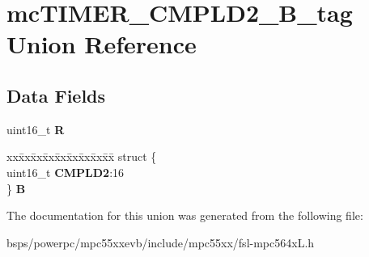 \hypertarget{unionmcTIMER__CMPLD2__16B__tag}{}\section{mc\+T\+I\+M\+E\+R\+\_\+\+C\+M\+P\+L\+D2\+\_\+B\+\_\+tag Union Reference}
\label{unionmcTIMER__CMPLD2__16B__tag}
\subsection*{Data Fields}
\begin{DoxyCompactItemize}
\item 
\mbox{\label{unionmcTIMER__CMPLD2__16B__tag_a7d78ee7aa745a5711a638a159fe9f9eb}} 
uint16\+\_\+t {\bfseries R}
\item 
\mbox{\label{unionmcTIMER__CMPLD2__16B__tag_a771452580fde7e850b4d64577c2aa39a}} 
\begin{tabbing}
xx\=xx\=xx\=xx\=xx\=xx\=xx\=xx\=xx\=\kill
struct \{\\
\>uint16\_t {\bfseries CMPLD2}:16\\
\} {\bfseries B}\\

\end{tabbing}\end{DoxyCompactItemize}


The documentation for this union was generated from the following file\+:\begin{DoxyCompactItemize}
\item 
bsps/powerpc/mpc55xxevb/include/mpc55xx/fsl-\/mpc564x\+L.\+h\end{DoxyCompactItemize}
